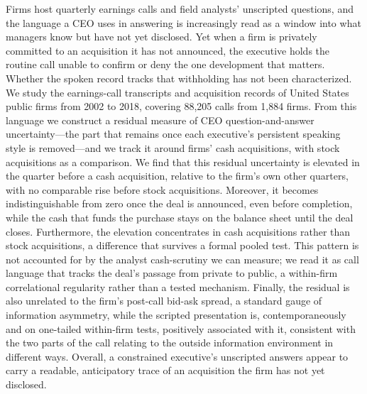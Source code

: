 Firms host quarterly earnings calls and field analysts' unscripted questions, and the language a CEO uses in answering is increasingly read as a window into what managers know but have not yet disclosed. Yet when a firm is privately committed to an acquisition it has not announced, the executive holds the routine call unable to confirm or deny the one development that matters. Whether the spoken record tracks that withholding has not been characterized. We study the earnings-call transcripts and acquisition records of United States public firms from 2002 to 2018, covering 88,205 calls from 1,884 firms. From this language we construct a residual measure of CEO question-and-answer uncertainty---the part that remains once each executive's persistent speaking style is removed---and we track it around firms' cash acquisitions, with stock acquisitions as a comparison. We find that this residual uncertainty is elevated in the quarter before a cash acquisition, relative to the firm's own other quarters, with no comparable rise before stock acquisitions. Moreover, it becomes indistinguishable from zero once the deal is announced, even before completion, while the cash that funds the purchase stays on the balance sheet until the deal closes. Furthermore, the elevation concentrates in cash acquisitions rather than stock acquisitions, a difference that survives a formal pooled test. This pattern is not accounted for by the analyst cash-scrutiny we can measure; we read it as call language that tracks the deal's passage from private to public, a within-firm correlational regularity rather than a tested mechanism. Finally, the residual is also unrelated to the firm's post-call bid-ask spread, a standard gauge of information asymmetry, while the scripted presentation is, contemporaneously and on one-tailed within-firm tests, positively associated with it, consistent with the two parts of the call relating to the outside information environment in different ways. Overall, a constrained executive's unscripted answers appear to carry a readable, anticipatory trace of an acquisition the firm has not yet disclosed.
